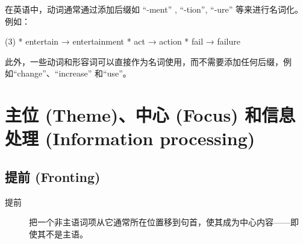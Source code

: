 在英语中，动词通常通过添加后缀如 ``-ment'' , ``-tion'', ``-ure'' 等来进行名词化。例如：
\begin{taskitem}(3)
* entertain → entertainment
* act → action
* fail → failure
\end{taskitem}
此外，一些动词和形容词可以直接作为名词使用，而不需要添加任何后缀，例
如``change''、``increase'' 和``use''。

\section{主位 (Theme)、中心 (Focus) 和信息处理 (Information processing)}


\subsection{提前 (Fronting)}

\begin{description}
\item[提前] 把一个非主语词项从它通常所在位置移到句首，使其成为中心内容——即
  使其不是主语。
\end{description}

